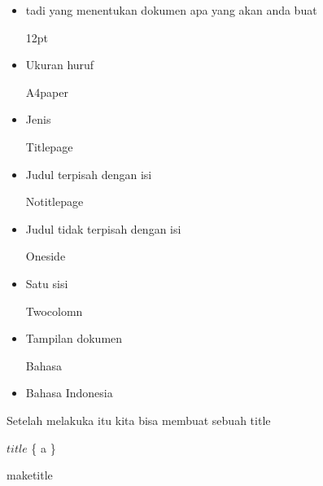 \begin{itemize}
	\item tadi yang menentukan dokumen apa yang akan anda buat\par

12pt\par

	\item Ukuran huruf\par

A4paper\par

	\item Jenis\par

Titlepage\par

	\item Judul terpisah dengan isi\par

Notitlepage\par

	\item Judul tidak terpisah dengan isi\par

Oneside\par

	\item Satu sisi\par

Twocolomn\par

	\item Tampilan dokumen\par

Bahasa\par

	\item Bahasa Indonesia
\end{itemize}\par


 Setelah melakuka itu kita bisa membuat sebuah title\par


\noindent $title$ \{ a \} \par


\noindent maketitle\par

